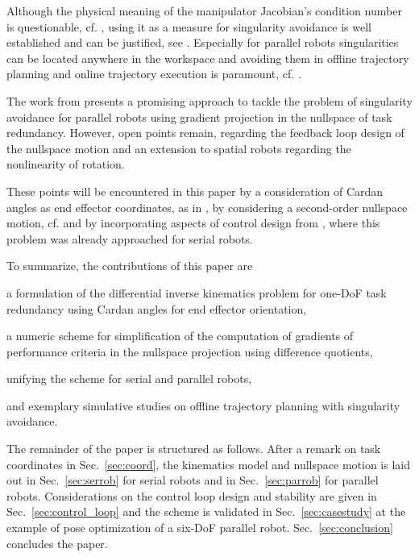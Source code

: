 \documentclass[a4paper,twoside]{article}
\begin{document}
Although the physical meaning of the manipulator Jacobian's condition number is questionable, cf. \cite{KotlarskiDoHeiOrt2010}, using it as a measure for singularity avoidance is well established and can be justified, see \cite{Merlet2006a}.
Especially for parallel robots singularities %
can be located anywhere in the workspace and avoiding them in offline trajectory planning and online trajectory execution is paramount, cf. \cite{LucesMilBen2017,GosselinSch2018}.

The work from \cite{AgarwalNasBan2016} presents a promising approach to tackle the problem of singularity avoidance for parallel robots using gradient projection in the nullspace of task redundancy.
However, open points remain, regarding the feedback loop design of the nullspace motion and an extension to spatial robots regarding the nonlinearity of rotation.

These points will be encountered in this paper %
by a consideration of Cardan angles as end effector coordinates, as in \cite{SchapplerTapOrt2019}, by considering a second-order nullspace motion, cf. \cite{ReiterMueGat2018} and by incorporating aspects of control design from \cite{DeLucaOriSic1992}, where this problem was already approached for serial robots.

To summarize, the contributions of this paper are
\begin{compactitem}
\item a formulation of the differential inverse kinematics problem for one-DoF task redundancy using Cardan angles for end effector orientation,
\item a numeric scheme for simplification of the computation of gradients of performance criteria in the nullspace projection using difference quotients,
\item unifying the scheme for serial and parallel robots,
\item and exemplary simulative studies on offline trajectory planning with singularity avoidance.
\end{compactitem}

The remainder of the paper is structured as follows.
After a remark on task coordinates in Sec.~\ref{sec:coord},
the kinematics model and nullspace motion is laid out in Sec.~\ref{sec:serrob} for serial robots and in Sec.~\ref{sec:parrob} for parallel robots.
Considerations on the control loop design and stability are given in Sec.~\ref{sec:control_loop} and the scheme is validated in Sec.~\ref{sec:casestudy} at the example of pose optimization 
of a six-DoF parallel robot. Sec.~\ref{sec:conclusion} concludes the paper.
\end{document}

